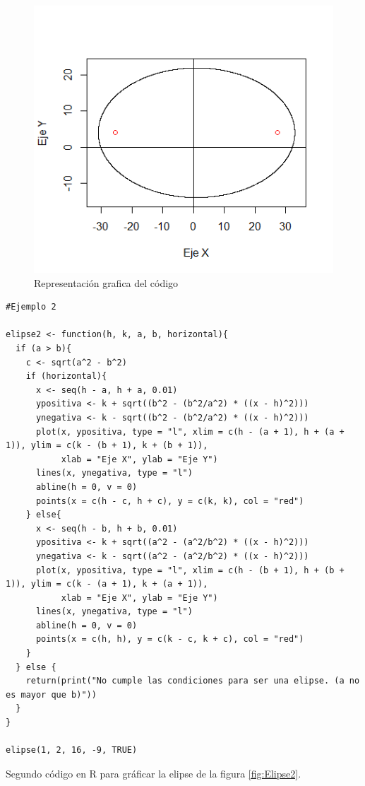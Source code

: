\documentclass[12pt,a4paper]{article} %
\begin{document}
\begin{figure}
\centering
\includegraphics[scale=0.7]{Elipse1}
\caption{Representación grafica del código}
\label{fig:Elipse}
\end{figure}

\begin{table}[htpb]
	\begin{lstlisting}
#Ejemplo 2

elipse2 <- function(h, k, a, b, horizontal){
  if (a > b){ 
    c <- sqrt(a^2 - b^2) 
    if (horizontal){ 
      x <- seq(h - a, h + a, 0.01) 
      ypositiva <- k + sqrt((b^2 - (b^2/a^2) * ((x - h)^2)))
      ynegativa <- k - sqrt((b^2 - (b^2/a^2) * ((x - h)^2))) 
      plot(x, ypositiva, type = "l", xlim = c(h - (a + 1), h + (a + 1)), ylim = c(k - (b + 1), k + (b + 1)),
           xlab = "Eje X", ylab = "Eje Y")
      lines(x, ynegativa, type = "l") 
      abline(h = 0, v = 0) 
      points(x = c(h - c, h + c), y = c(k, k), col = "red") 
    } else{
      x <- seq(h - b, h + b, 0.01)
      ypositiva <- k + sqrt((a^2 - (a^2/b^2) * ((x - h)^2)))
      ynegativa <- k - sqrt((a^2 - (a^2/b^2) * ((x - h)^2)))
      plot(x, ypositiva, type = "l", xlim = c(h - (b + 1), h + (b + 1)), ylim = c(k - (a + 1), k + (a + 1)),
           xlab = "Eje X", ylab = "Eje Y")
      lines(x, ynegativa, type = "l")
      abline(h = 0, v = 0)
      points(x = c(h, h), y = c(k - c, k + c), col = "red")
    }
  } else {
    return(print("No cumple las condiciones para ser una elipse. (a no es mayor que b)"))
  }
}

elipse(1, 2, 16, -9, TRUE)

	\end{lstlisting}
	\caption{Segundo código en R para gráficar la elipse de la figura \ref{fig:Elipse2}.}
\label{alg:Elipse2}	
\end{table}
\end{document}
